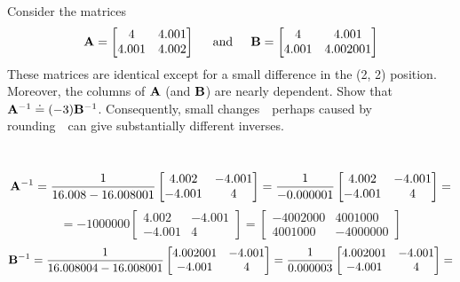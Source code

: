         Consider the matrices
        \[
            \bold{A} = \begin{bmatrix}
                4 & 4.001 \\
                4.001 & 4.002
            \end{bmatrix}\hspace{0.2in}\text{and}\hspace{0.2in}
            \bold{B} = \begin{bmatrix}
                4 & 4.001 \\
                4.001 & 4.002001
            \end{bmatrix}
        \]
        These matrices are identical except for a small difference in the (2, 2) position. Moreover, the columns of $\bold{A}$ (and $\bold{B}$) are nearly dependent. Show that $\bold{A}^{-1} \doteq (-3) \bold{B}^{-1}$. Consequently, small changes~\textemdash~perhaps caused by rounding~\textemdash~can give substantially different inverses.
        \par\
        \[
            \bold{A}^{-1}
            =
            \frac{1}{16.008-16.008001}
            \begin{bmatrix}
                4.002 & -4.001 \\
                -4.001 & 4
            \end{bmatrix}
            =
            \frac{1}{-0.000001}
            \begin{bmatrix}
                4.002 & -4.001 \\
                -4.001 & 4
            \end{bmatrix}
            =
        \]
        \[
            =
            -1000000
            \begin{bmatrix}
                4.002 & -4.001 \\
                -4.001 & 4
            \end{bmatrix}
            =
            \begin{bmatrix}
                -4002000 & 4001000 \\
                4001000 & -4000000
            \end{bmatrix}
        \]
        \[
            \bold{B}^{-1}
            =
            \frac{1}{16.008004-16.008001}
            \begin{bmatrix}
                4.002001 & -4.001 \\
                -4.001 & 4
            \end{bmatrix}
            =
            \frac{1}{0.000003}
            \begin{bmatrix}
                4.002001 & -4.001 \\
                -4.001 & 4
            \end{bmatrix}
            =
            \]
